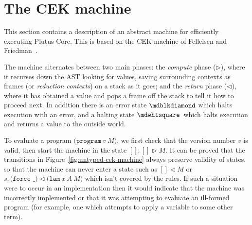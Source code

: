 \section{The CEK machine}
This section contains a description of an abstract machine for efficiently
executing Plutus Core.  This is based on the CEK machine of Felleisen and
Friedman~\cite{Felleisen-CK-CEK}.

\noindent The machine alternates between two main phases: the
\textit{compute} phase ($\triangleright$), where it recurses down
the AST looking for values, saving surrounding contexts as frames (or
\textit{reduction contexts}) on a stack as it goes; and the
\textit{return} phase ($\triangleleft$), where it has obtained a value and
pops a frame off the stack to tell it how to proceed next.  In
addition there is an error state $\cekerror$ which halts execution
with an error, and a halting state $\cekhalt{}$ which halts execution and
returns a value to the outside world.%
%
%
%

To evaluate a program $\texttt{(program}\ v\ M \texttt{)}$, we first check that
the version number $v$ is valid, then start the machine in the state $[];[]
\triangleright M$.  It can be proved that the transitions in
Figure~\ref{fig:untyped-cek-machine} always preserve validity of states, so that
the machine can never enter a state such as $[] \triangleleft M$ or $s,
\texttt{(force \_)} \triangleleft \texttt{(lam}\ x\ A \ M\texttt{)}$ which isn't
covered by the rules.  If such a situation were to occur in an implementation
then it would indicate that the machine was incorrectly implemented or that it
was attempting to evaluate an ill-formed program (for example, one which attempts
to apply a variable to some other term).


